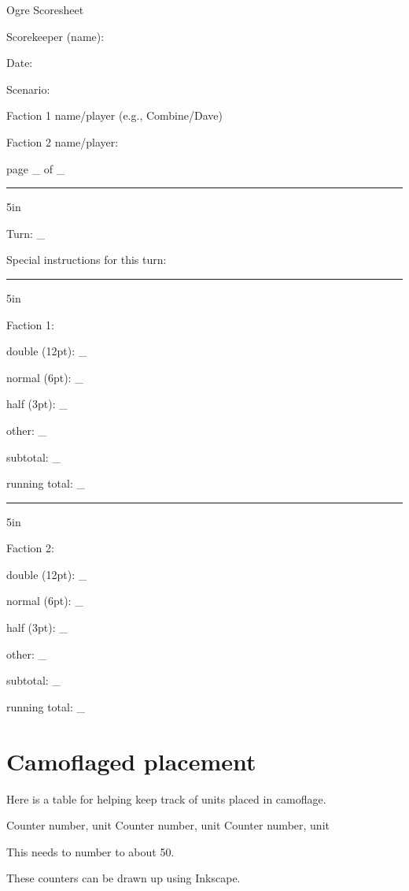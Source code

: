 \documentclass[10pt]{article}
\begin{document}
Ogre Scoresheet

Scorekeeper (name):

Date:

Scenario:

Faction 1 name/player (e.g., Combine/Dave)

Faction 2 name/player:

page \_ of \_

\hrule{5in}

Turn: \_

Special instructions for this turn:

\hrule{5in}

Faction 1:

double (12pt): \_

normal (6pt): \_

half (3pt): \_

other: \_

subtotal: \_

running total: \_

\hrule{5in}

Faction 2:

double (12pt): \_

normal (6pt): \_

half (3pt): \_

other: \_

subtotal: \_

running total: \_

\section{Camoflaged placement}

Here is a table for helping keep track of units placed in camoflage.

Counter number, unit
Counter number, unit
Counter number, unit

This needs to number to about 50.

These counters can be drawn up using Inkscape.
\end{document}
